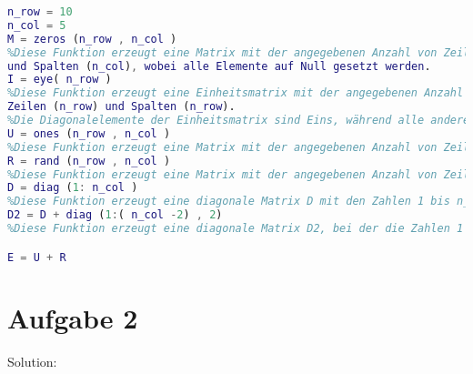 \documentclass{article}
\begin{document}
\begin{lstlisting}[language=Matlab]
n_row = 10
n_col = 5
M = zeros (n_row , n_col )
%Diese Funktion erzeugt eine Matrix mit der angegebenen Anzahl von Zeilen (n_row)
und Spalten (n_col), wobei alle Elemente auf Null gesetzt werden.
I = eye( n_row )
%Diese Funktion erzeugt eine Einheitsmatrix mit der angegebenen Anzahl von 
Zeilen (n_row) und Spalten (n_row).
%Die Diagonalelemente der Einheitsmatrix sind Eins, während alle anderen Elemente Null sind.
U = ones (n_row , n_col )
%Diese Funktion erzeugt eine Matrix mit der angegebenen Anzahl von Zeilen (n_row) und Spalten (n_col), wobei alle Elemente auf Eins gesetzt werden.
R = rand (n_row , n_col )
%Diese Funktion erzeugt eine Matrix mit der angegebenen Anzahl von Zeilen (n_row) und Spalten (n_col), wobei die Elemente zufällige Werte zwischen 0 und 1 haben.
D = diag (1: n_col )
%Diese Funktion erzeugt eine diagonale Matrix D mit den Zahlen 1 bis n_col auf der Hauptdiagonale.
D2 = D + diag (1:( n_col -2) , 2)
%Diese Funktion erzeugt eine diagonale Matrix D2, bei der die Zahlen 1 bis n_col-2 auf der zweiten Nebendiagonale platziert werden.

E = U + R
\end{lstlisting}


\section{Aufgabe 2}
Solution:\\
\end{document}
